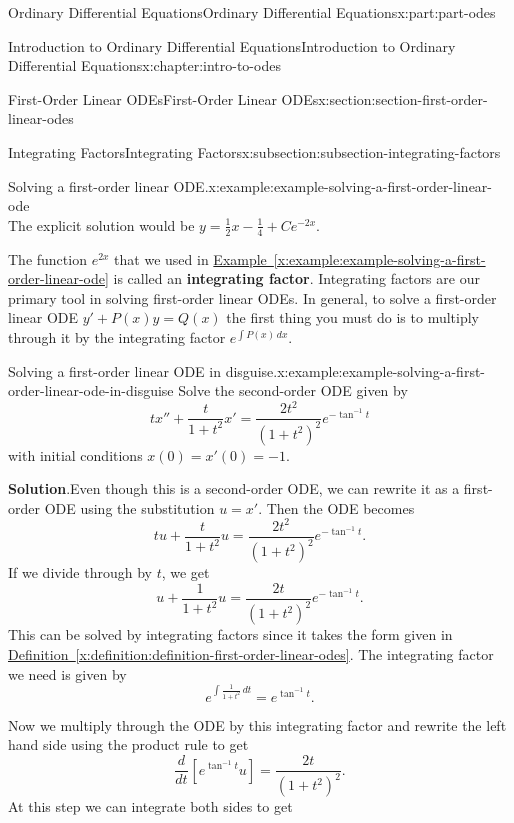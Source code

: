 \documentclass[oneside,10pt,]{book}
\newcommand{\blocktitlefont}{\relax}
\newcommand{\xreffont}{\relax}
\newcommand{\terminology}[1]{\textbf{#1}}
\numberwithin{equation}{part}
\newcommand{\dv}[3][]{\dfrac{d^{#1} #2}{d #3^{#1}}}
\begin{document}
\begin{partptx}{Ordinary Differential Equations}{}{Ordinary Differential Equations}{}{}{x:part:part-odes}
\begin{chapterptx}{Introduction to Ordinary Differential Equations}{}{Introduction to Ordinary Differential Equations}{}{}{x:chapter:intro-to-odes}
\begin{sectionptx}{First-Order Linear ODEs}{}{First-Order Linear ODEs}{}{}{x:section:section-first-order-linear-odes}
\begin{subsectionptx}{Integrating Factors}{}{Integrating Factors}{}{}{x:subsection:subsection-integrating-factors}
\begin{example}{Solving a first-order linear ODE.}{x:example:example-solving-a-first-order-linear-ode}
\begin{equation*}
\end{equation*}
The explicit solution would be \(y = \frac{1}{2}x - \frac{1}{4} + Ce^{-2x}\).%
\end{example}
The function \(e^{2x}\) that we used in \hyperref[x:example:example-solving-a-first-order-linear-ode]{Example~{\xreffont\ref{x:example:example-solving-a-first-order-linear-ode}}} is called an \terminology{integrating factor}. Integrating factors are our primary tool in solving first-order linear ODEs. In general, to solve a first-order linear ODE \(y' +P(x)y=Q(x)\) the first thing you must do is to multiply through it by the integrating factor \(e^{\int P(x)\,dx}\).%
\begin{example}{Solving a first-order linear ODE in disguise.}{x:example:example-solving-a-first-order-linear-ode-in-disguise}%
Solve the second-order ODE given by%
\begin{equation*}
tx''+\frac{t}{1+t^{2}}x' = \frac{2t^{2}}{(1+t^{2})^{2}}e^{-\tan^{-1}t}
\end{equation*}
with initial conditions \(x(0) = x'(0) = -1.\)%
\par\smallskip%
\noindent\textbf{\blocktitlefont Solution}.\hypertarget{g:solution:idp105548780072992}{}\quad{}Even though this is a second-order ODE, we can rewrite it as a first-order ODE using the substitution \(u = x'\). Then the ODE becomes%
\begin{equation*}
tu+\frac{t}{1+t^{2}}u = \frac{2t^{2}}{(1+t^{2})^{2}}e^{-\tan^{-1}t}.
\end{equation*}
If we divide through by \(t\), we get%
\begin{equation*}
u+\frac{1}{1+t^{2}}u = \frac{2t}{(1+t^{2})^{2}}e^{-\tan^{-1}t}.
\end{equation*}
This can be solved by integrating factors since it takes the form given in \hyperref[x:definition:definition-first-order-linear-odes]{Definition~{\xreffont\ref{x:definition:definition-first-order-linear-odes}}}. The integrating factor we need is given by%
\begin{equation*}
e^{\int \frac{1}{1+t^{2}}\,dt} = e^{\tan^{-1}t}.
\end{equation*}
%
\par
Now we multiply through the ODE by this integrating factor and rewrite the left hand side using the product rule to get%
\begin{equation*}
\dv{}{t}[e^{\tan^{-1}t}u] = \frac{2t}{(1+t^{2})^{2}}.
\end{equation*}
At this step we can integrate both sides to get%
\begin{equation*}

\end{equation*}
\end{example}
\end{subsectionptx}
\end{sectionptx}
\end{chapterptx}
\end{partptx}
\end{document}
